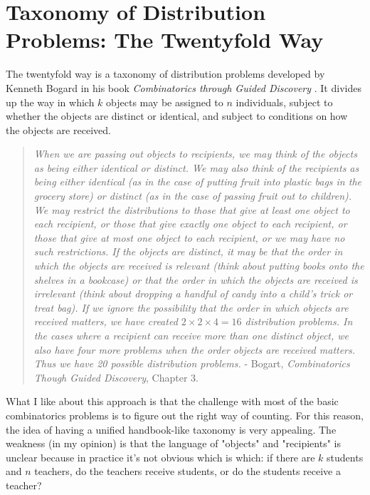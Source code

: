 \section{Taxonomy of Distribution Problems: The Twentyfold Way}
\label{twentyfoldway}

The twentyfold way is a taxonomy of distribution problems developed by Kenneth Bogard in his book \textit{Combinatorics through Guided Discovery} \cite{bogart2004combinatorics}. It divides up the way in which $k$ objects may be assigned to $n$ individuals, subject to whether the objects are distinct or identical, and subject to conditions on how the objects are received.


\begin{quote}
\textit{When we are passing out objects to recipients, we may think of the objects as being either identical or distinct. We may also think of the recipients as being either identical (as in the case of putting fruit into plastic bags in the grocery store) or distinct (as in the case of passing fruit out to children). We may restrict the distributions to those that give at least one object to each recipient, or those that give exactly one object to each recipient, or those that give at most one object to each recipient, or we may have no such restrictions. If the objects are distinct, it may be that the order in which the objects are received is relevant (think about putting books onto the shelves in a bookcase) or that the order in which the objects are received is irrelevant (think about dropping a handful of candy into a child’s trick or treat bag). If we ignore the possibility that the order in which objects are received matters, we have created $2\times2\times4 = 16$ distribution problems. In the cases where a recipient can receive more than one distinct object, we also have four more problems when the order objects are received matters. Thus we have 20 possible distribution problems.} - Bogart, \textit{Combinatorics Though Guided Discovery}, Chapter 3.
\end{quote}


What I like about this approach is that the challenge with most of the basic combinatorics problems is to figure out the right way of counting. For this reason, the idea of having a unified handbook-like taxonomy is very appealing. The weakness (in my opinion) is that the language of "objects" and "recipients" is unclear because in practice it's not obvious which is which: if there are $k$ students and $n$ teachers, do the teachers receive students, or do the students receive a teacher? 

